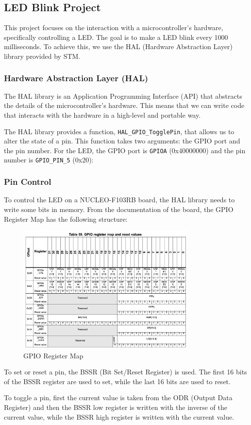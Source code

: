 \subsection{LED Blink Project}

This project focuses on the interaction with a microcontroller's hardware, specifically controlling a LED. The goal is to make a LED blink every 1000 milliseconds. To achieve this, we use the HAL (Hardware Abstraction Layer) library provided by STM.

\subsubsection{Hardware Abstraction Layer (HAL)}

The HAL library is an Application Programming Interface (API) that abstracts the details of the microcontroller's hardware. This means that we can write code that interacts with the hardware in a high-level and portable way.

The HAL library provides a function, \texttt{HAL\_GPIO\_TogglePin}, that allows us to alter the state of a pin. This function takes two arguments: the GPIO port and the pin number. For the LED, the GPIO port is \texttt{GPIOA} (0x40000000) and the pin number is \texttt{GPIO\_PIN\_5} (0x20):

\subsubsection{Pin Control}

To control the LED on a NUCLEO-F103RB board, the HAL library needs to write some bits in memory. From the documentation of the board, the GPIO Register Map has the following structure:

\begin{figure}[ht]
    \centering
    \includegraphics[width=0.8\textwidth]{images/projects/gpio_register_map.png}
    \caption{GPIO Register Map}
    \label{fig:gpio_register_map}
\end{figure}

To set or reset a pin, the BSSR (Bit Set/Reset Register) is used. The first 16 bits of the BSSR register are used to set, while the last 16 bits are used to reset.

To toggle a pin, first the current value is taken from the ODR (Output Data Register) and then the BSSR low register is written with the inverse of the current value, while the BSSR high register is written with the current value.